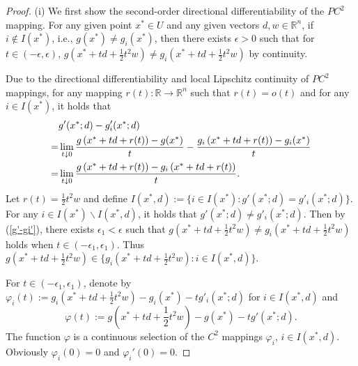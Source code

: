 \documentclass[11pt]{article}
\theoremstyle{definition}
\theoremstyle{remark}
\numberwithin{equation}{section}
\begin{document}
\begin{proof}
(i) We first show the second-order directional differentiability of the $PC^2$ mapping.
For any given point $x^*\in U$ and any given  vectors $d,w\in \mathbb{R}^n$, if $i\notin I(x^*)$, i.e., $g(x^*)\neq g_i(x^*)$, then there exists $\epsilon>0$
such that for $t\in(-\epsilon,\epsilon)$, $g\left(x^*+td+\frac{1}{2}t^2w\right)\neq g_i\left(x^*+td+\frac{1}{2}t^2w\right)$  by continuity.


 Due to the directional differentiability  and local Lipschitz continuity of $PC^2$ mappings,
 for any mapping $r(t):\mathbb{R}\to \mathbb{R}^n$ such that
$r(t)=o(t)$  and for any $i\in I(x^*)$,  it holds that
\begin{align}\label{g'-gi'}
   &g'(x^*;d)-g'_i(x^*;d)\notag\\
= &\lim_{t\downarrow 0}\frac{g\left(x^*+td+r(t)\right)-g(x^*)}
{t}-\frac{g_i\left(x^*+td+r(t)\right)-g_i(x^*)}
{t} \notag\\
=&\lim_{t\downarrow 0}\frac{g\left(x^*+td+r(t)\right)-g_i\left(x^*+td+r(t)\right)}
{t}.
\end{align}
 Let $r(t)=\frac{1}{2}t^2w$ and define $ I(x^*,d):=\{i\in I(x^*):g'(x^*;d)=g'_i(x^*;d)\}$. For any $i\in I(x^*)\backslash I(x^*,d)$, it holds that   $g'(x^*;d)\neq g'_i(x^*;d)$. Then by (\ref{g'-gi'}), there exists  $\epsilon_1<\epsilon$ such that
 $g\left(x^*+td+\frac{1}{2}t^2w\right)\neq g_i\left(x^*+td+\frac{1}{2}t^2w\right)$ holds when $t\in (-\epsilon_1,\epsilon_1)$.
Thus $g\left(x^*+td+\frac{1}{2}t^2w\right)\in \{g_{i}\left(x^*+td+\frac{1}{2}t^2w\right):i\in I(x^*,d)\}$.

For $t\in (-\epsilon_1,\epsilon_1)$, denote by $\varphi_i(t):=g_i\left(x^*+td+\frac{1}{2}t^2w\right)-g_i(x^*)-tg'_i(x^*;d)$ for $i\in I(x^*,d)$ and
  $$\varphi(t):=g\left(x^*+td+\frac{1}{2}t^2w\right)-g(x^*)-tg'(x^*;d).$$
The function $\varphi$
    is  a continuous selection of the $C^2$ mappings $\varphi_i$, $i\in I(x^*,d)$.
Obviously $\varphi_i(0)=0$ and $\varphi_i'(0)=0$.


\end{proof}
\end{document}
